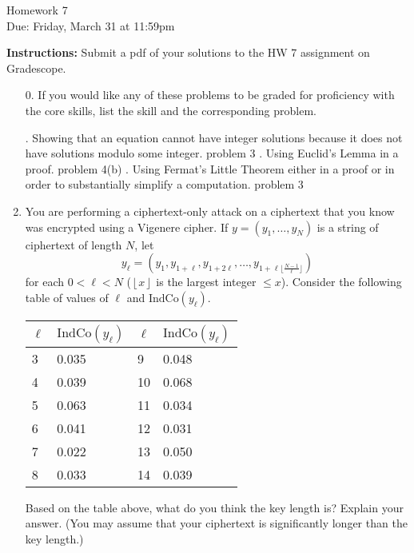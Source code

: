 \documentclass[11pt]{article}
\newcommand{\n}{\vspace{0.3cm}}
\begin{document}
\begin{center}
{\Large Homework 7}\\
Due: Friday,  March 31 at 11:59pm\\


\end{center}
{\bf Instructions:} Submit a pdf of your solutions to the HW 7 assignment on Gradescope.  



\begin{enumerate}
\item[0.] If you would like any of these problems to be graded for proficiency with the core skills, list the skill and the corresponding problem. 
  \begin{outline}
    . Showing that an equation cannot have integer solutions because it does not have solutions modulo some integer.
      \2 problem 3
    . Using Euclid’s Lemma in a proof.
      \2 problem 4(b)
    . Using Fermat’s Little Theorem either in a proof or in order to substantially simplify a computation.
      \2 problem 3
  \end{outline} \n


\item  You are performing a ciphertext-only attack on a ciphertext that you know was encrypted using a Vigenere cipher.  If $y = (y_1, \ldots, y_{N})$ is a string of ciphertext of length $N$, let $$y_{\ell} = (y_1, y_{1+\ell}, y_{1+2\ell}, \ldots, y_{1+\ell\lfloor{\frac{N-1}{\ell}}\rfloor})$$ for each $0 < \ell <N$ ($\left\lfloor x \right\rfloor$ is the largest integer $\le x$).  Consider the following table of values of $\ell$ and $\mathrm{IndCo}(y_{\ell})$.

\begin{center}
    \begin{tabular}{ l | l | l | l }
    $\ell$ & $\mathrm{IndCo}(y_\ell)$ &  $\ell$ & $\mathrm{IndCo}(y_\ell)$  \\ 
    \hline
    3 & 0.035 & 9  & 0.048\\ 
    4 & 0.039 & 10 & 0.068  \\ 
    5 & 0.063 & 11 & 0.034  \\
    6 & 0.041  & 12 & 0.031  \\
    7 & 0.022  &  13 & 0.050\\
    8 & 0.033  &  14 & 0.039\\
    \end{tabular}
\end{center}

Based on the table above, what do you think the key length is?  Explain your answer. (You may assume that your ciphertext is significantly longer than the key length.) \n


\end{enumerate}
\end{document}
